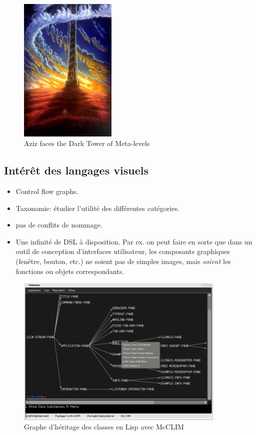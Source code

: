 \documentclass{article}
\begin{document}
\begin{figure}[htbp]
  \centering
  \includegraphics[height=7cm]{dark-tower-of-meta-levels}
  \caption{Aziz faces the Dark Tower of Meta-levels}%
\label{fig:dark-tower-meta-levels}
\end{figure}

\subsection{Intérêt des langages visuels}
\begin{itemize}
\item Control flow graphs.
\item Taxonomie: étudier l'utilité des différentes catégories.
\item pas de conflits de nommage.
\item Une infinité de DSL à disposition. Par ex. on peut faire en sorte que dans un outil de conception d'interfaces utilisateur, les composants graphiques (fenêtre, bouton, etc.) ne soient pas de simples images, mais \emph{soient} les fonctions ou objets correspondants.
\end{itemize}

\begin{figure}[h!]
  \centering
  \includegraphics[width=10cm]{lisp-class-graph}
  \caption{Graphe d'héritage des classes en Lisp avec McCLIM}
\label{fig:lisp-class-graph}
\end{figure}
\end{document}

